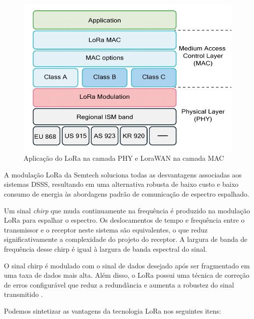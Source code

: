 \documentclass[
	12pt,				%
	openright,			%
	twoside,			%
	a4paper,			%
	english,			%
	french,				%
	spanish,			%
	brazil				%
	]{abntex2}
\begin{document}
\begin{figure}[H]
	\caption{\label{fig:OSI}Aplicação do LoRa na camada PHY e LoraWAN na camada MAC}
	\begin{center}
	    \includegraphics[scale=0.45]{img/OSI.jpg}
	\end{center}
\end{figure}

A modulação LoRa da Semtech soluciona todas as desvantagens associadas aos sistemas DSSS, resultando em uma alternativa robusta de baixo custo e baixo consumo de energia às abordagens padrão de comunicação de espectro espalhado.

Um sinal \emph{chirp} que muda continuamente na frequência é produzido na modulação LoRa para espalhar o espectro. Os deslocamentos de tempo e frequência entre o transmissor e o receptor neste sistema são equivalentes, o que reduz significativamente a complexidade do projeto do receptor. A largura de banda de frequência desse chirp é igual à largura de banda espectral do sinal.

O sinal chirp é modulado com o sinal de dados desejado após ser fragmentado em uma taxa de dados mais alta. Além disso, o LoRa possui uma técnica de correção de erros configurável que reduz a redundância e aumenta a robustez do sinal transmitido \cite{semtech_2015}.

Podemos sintetizar as vantagens da tecnologia LoRa nos seguintes itens:
\end{document}
